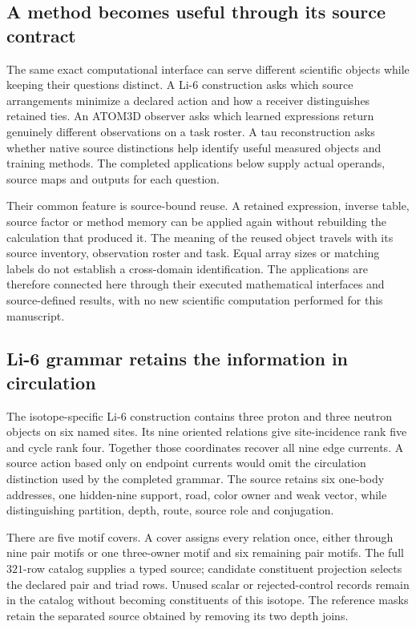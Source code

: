 \label{v3-applications-reuse}

\subsection{A method becomes useful through its source contract}

The same exact computational interface can serve different scientific objects while keeping their questions distinct. A Li-6 construction asks which source arrangements minimize a declared action and how a receiver distinguishes retained ties. An ATOM3D observer asks which learned expressions return genuinely different observations on a task roster. A tau reconstruction asks whether native source distinctions help identify useful measured objects and training methods. The completed applications below supply actual operands, source maps and outputs for each question.

Their common feature is source-bound reuse. A retained expression, inverse table, source factor or method memory can be applied again without rebuilding the calculation that produced it. The meaning of the reused object travels with its source inventory, observation roster and task. Equal array sizes or matching labels do not establish a cross-domain identification. The applications are therefore connected here through their executed mathematical interfaces and source-defined results, with no new scientific computation performed for this manuscript.

\subsection{Li-6 grammar retains the information in circulation}

The isotope-specific Li-6 construction contains three proton and three neutron objects on six named sites. Its nine oriented relations give site-incidence rank five and cycle rank four. Together those coordinates recover all nine edge currents. A source action based only on endpoint currents would omit the circulation distinction used by the completed grammar. The source retains six one-body addresses, one hidden-nine support, road, color owner and weak vector, while distinguishing partition, depth, route, source role and conjugation. 

There are five motif covers. A cover assigns every relation once, either through nine pair motifs or one three-owner motif and six remaining pair motifs. The full $321$-row catalog supplies a typed source; candidate constituent projection selects the declared pair and triad rows. Unused scalar or rejected-control records remain in the catalog without becoming constituents of this isotope. The reference masks retain the separated source obtained by removing its two depth joins.


